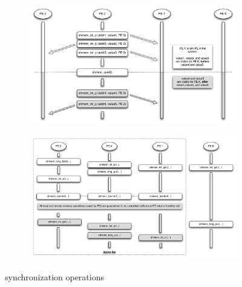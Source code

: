 \begin{figure}
        \begin{subfigure}{0.48\textwidth}
                \includegraphics[width=\textwidth]{diagrams/updated/quiet}
                \caption{}
                \label{fig:quiet}
        \end{subfigure}
	\begin{subfigure}{0.48\textwidth}
		\includegraphics[width=\textwidth]{diagrams/updated/barrier}
		\caption{}
		\label{fig:barrier}
	\end{subfigure}
        \caption{\openshmem{} synchronization operations}\label{fig:animals}
\end{figure}
